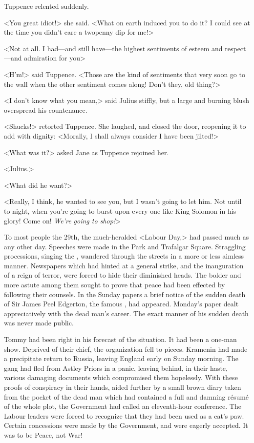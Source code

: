 Tuppence relented suddenly.

<You great idiot!> she said. <What on earth induced you to do it? I could see at the time you didn't care a twopenny dip for me!>

<Not at all. I had—and still have—the highest sentiments of esteem and respect—and admiration for you\longdash>

<H'm!> said Tuppence. <Those are the kind of sentiments that very soon go to the wall when the other sentiment comes along! Don't they, old thing?>

<I don't know what you mean,> said Julius stiffly, but a large and burning blush overspread his countenance.

<Shucks!> retorted Tuppence. She laughed, and closed the door, reopening it to add with dignity: <Morally, I shall always consider I have been jilted!>

<What was it?> asked Jane as Tuppence rejoined her.

<Julius.>

<What did he want?>

<Really, I think, he wanted to see you, but I wasn't going to let him. Not until to-night, when you're going to burst upon every one like King Solomon in his glory! Come on! \emph{We're going to shop!}>

To most people the 29th, the much-heralded <Labour Day,> had passed much as any other day. Speeches were made in the Park and Trafalgar Square. Straggling processions, singing the , wandered through the streets in a more or less aimless manner. Newspapers which had hinted at a general strike, and the inauguration of a reign of terror, were forced to hide their diminished heads. The bolder and more astute among them sought to prove that peace had been effected by following their counsels. In the Sunday papers a brief notice of the sudden death of Sir James Peel Edgerton, the famous , had appeared. Monday's paper dealt appreciatively with the dead man's career. The exact manner of his sudden death was never made public.

Tommy had been right in his forecast of the situation. It had been a one-man show. Deprived of their chief, the organization fell to pieces. Kramenin had made a precipitate return to Russia, leaving England early on Sunday morning. The gang had fled from Astley Priors in a panic, leaving behind, in their haste, various damaging documents which compromised them hopelessly. With these proofs of conspiracy in their hands, aided further by a small brown diary taken from the pocket of the dead man which had contained a full and damning résumé of the whole plot, the Government had called an eleventh-hour conference. The Labour leaders were forced to recognize that they had been used as a cat's paw. Certain concessions were made by the Government, and were eagerly accepted. It was to be Peace, not War!

